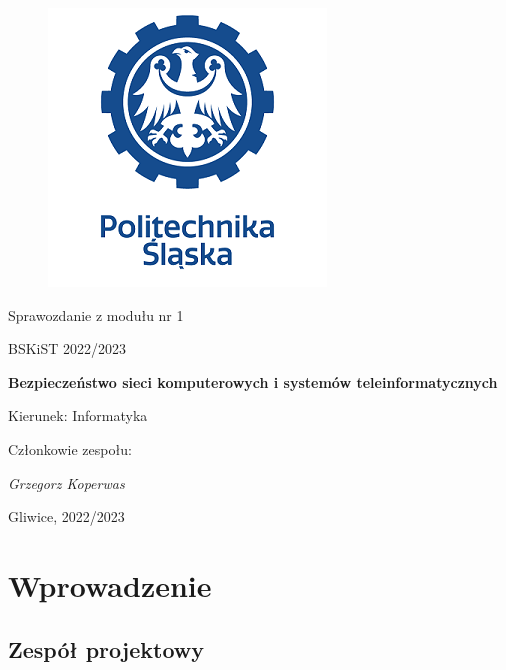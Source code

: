 \documentclass[12pt,a4paper]{article}
\begin{document}
\nocite{*}

\clearpage
\begin{figure}[h]
\centering
\includegraphics{media/ps-logo.png}
\end{figure}
\hspace{3cm}
\begin{center}Sprawozdanie z modułu nr 1\end{center}
\begin{center}BSKiST 2022/2023\end{center}
\hspace{3cm}
\begin{center}\large\textbf{Bezpieczeństwo sieci komputerowych i systemów teleinformatycznych}\end{center}
\hspace{7cm}
\begin{flushright}Kierunek: Informatyka
\end{flushright}
\begin{flushright}Członkowie zespołu:
\par
\textit{Grzegorz Koperwas}
\end{flushright}
\vfill
\begin{center}Gliwice, 2022/2023\end{center}

\newpage
{}
\tableofcontents

\newpage
\section{Wprowadzenie}

\subsection{Zespół projektowy}
\end{document}
